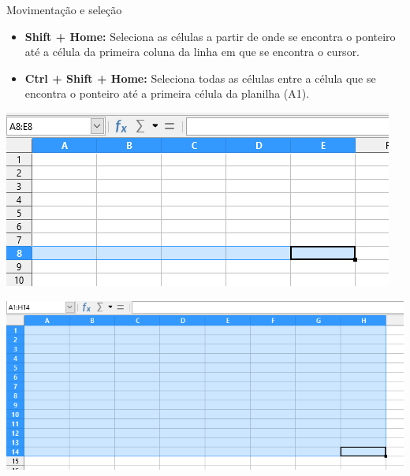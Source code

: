 \begin{frame}{Movimentação e seleção}
	\begin{block}{}
		\begin{itemize}
			\item \textbf{Shift + Home:}
			Seleciona as células a partir de onde se encontra o ponteiro até a célula da primeira coluna da linha em que se encontra o cursor.
			\item \textbf{Ctrl + Shift + Home:}
			Seleciona todas as células entre a célula que se encontra o ponteiro até a primeira célula da planilha (A1).
		\end{itemize}
	\end{block}

	\bigskip
	
	\begin{minipage}{0.49\linewidth}
		\centering
		\includegraphics[width=1\linewidth]{Figuras/Ch06/fig12}
	\end{minipage}\hfill
	\begin{minipage}{0.49\linewidth}
		\centering
		\includegraphics[width=1\linewidth]{Figuras/Ch06/fig13}
	\end{minipage}
\end{frame}


